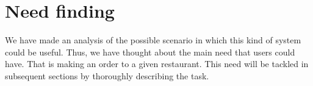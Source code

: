 \section{Need finding}
We have made an analysis of the possible scenario in which this kind
of system could be useful. Thus, we have thought about the main need
that users could have. That is making an order to a given restaurant.
This need will be tackled in subsequent sections by thoroughly
describing the task.